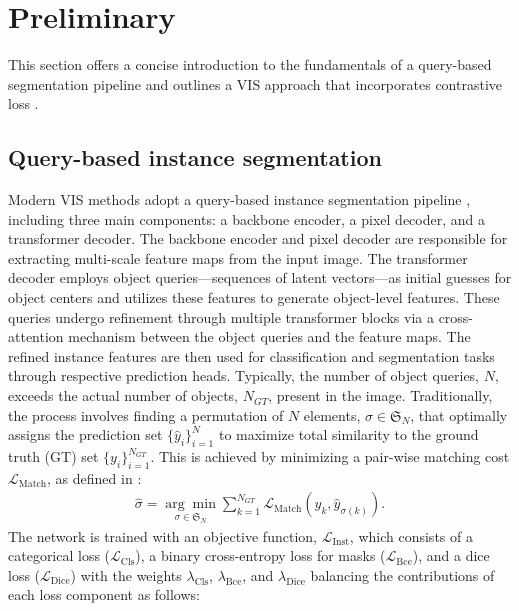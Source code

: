 \documentclass[10pt,twocolumn,letterpaper]{article}
\begin{document}
\section{Preliminary}
\label{sec:preliminary}
This section offers a concise introduction to the fundamentals of a query-based segmentation pipeline and outlines a VIS approach that incorporates contrastive loss \citep{wu2022defense, li2023mdqe, ying2023ctvis, li2023tube}.



\subsection{Query-based instance segmentation}
Modern VIS methods adopt a query-based instance segmentation pipeline \citep{cheng2021per, cheng2022masked}, including three main components: a backbone encoder, a pixel decoder, and a transformer decoder.
The backbone encoder and pixel decoder are responsible for extracting multi-scale feature maps from the input image. The transformer decoder employs object queries—sequences of latent vectors—as initial guesses for object centers and utilizes these features to generate object-level features.
These queries undergo refinement through multiple transformer blocks via a cross-attention mechanism between the object queries and the feature maps. 
The refined instance features are then used for classification and segmentation tasks through respective prediction heads.
Typically, the number of object queries, $N$, exceeds the actual number of objects, $N_{GT}$, present in the image. 
Traditionally, the process involves finding a permutation of $N$ elements, $\sigma \in \mathfrak{S}_{N}$, that optimally assigns the prediction set $\{\hat{y}_i\}_{i=1}^N$ to maximize total similarity to the ground truth (GT) set $\{y_i\}_{i=1}^{N_{GT}}$. This is achieved by minimizing a pair-wise matching cost $\mathcal{L}_{\text {Match}}$, as defined in \citep{cheng2021mask2former}:
\begin{equation}
\label{eq:matching}
    \begin{gathered}
        \hat{\sigma} = \underset{\sigma \in \mathfrak{S}_{N}}{\arg \min } \sum_{k=1}^{N_{GT}} \mathcal{L}_{\text {Match}}\left(y_k, \hat{y}_{\sigma(k)}\right).
    \end{gathered}
\end{equation}
The network is trained with an objective function,  $\mathcal{L}_{\text{Inst}}$, which consists of a categorical loss ($\mathcal{L}_{\text{Cls}}$), a binary cross-entropy loss for masks ($\mathcal{L}_{\text{Bce}}$), and a dice loss ($\mathcal{L}_{\text {Dice}}$) with the weights $\lambda_{\text {Cls}}$, $\lambda_{\text {Bce}}$, and $\lambda_{\text {Dice}}$ balancing the contributions of each loss component as follows:
\end{document}
